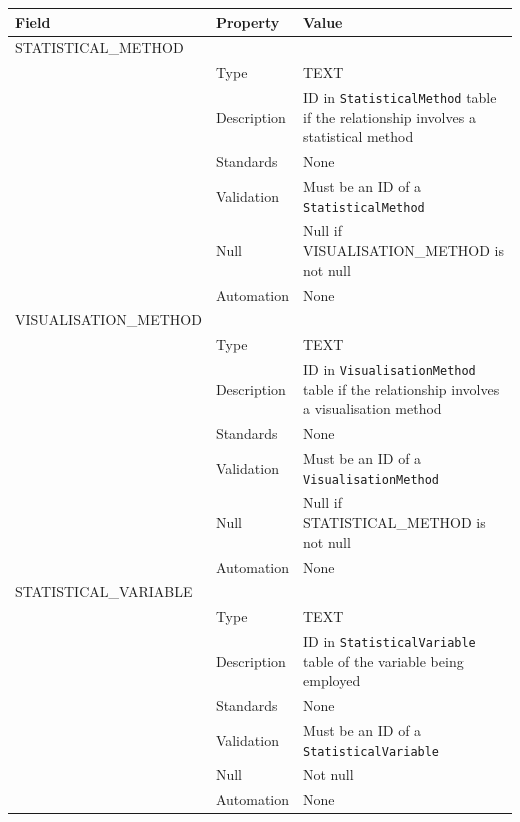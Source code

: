 \documentclass[
]{article}
\newcounter{none}
\begin{document}
{\def\LTcaptype{none} 
\begin{longtable}[]{@{}
  >{\raggedright\arraybackslash}p{}
  >{\raggedright\arraybackslash}p{}
  >{\raggedright\arraybackslash}p{}@{}}
\toprule\noalign{}
\begin{minipage}[b]{\linewidth}\raggedright
Field
\end{minipage} & \begin{minipage}[b]{\linewidth}\raggedright
Property
\end{minipage} & \begin{minipage}[b]{\linewidth}\raggedright
Value
\end{minipage} \\
\midrule\noalign{}
\endhead
\bottomrule\noalign{}
\endlastfoot
STATISTICAL\_METHOD & & \\
& Type & TEXT \\
& Description & ID in \texttt{StatisticalMethod} table if the
relationship involves a statistical method \\
& Standards & None \\
& Validation & Must be an ID of a \texttt{StatisticalMethod} \\
& Null & Null if VISUALISATION\_METHOD is not null \\
& Automation & None \\
VISUALISATION\_METHOD & & \\
& Type & TEXT \\
& Description & ID in \texttt{VisualisationMethod} table if the
relationship involves a visualisation method \\
& Standards & None \\
& Validation & Must be an ID of a \texttt{VisualisationMethod} \\
& Null & Null if STATISTICAL\_METHOD is not null \\
& Automation & None \\
STATISTICAL\_VARIABLE & & \\
& Type & TEXT \\
& Description & ID in \texttt{StatisticalVariable} table of the variable
being employed \\
& Standards & None \\
& Validation & Must be an ID of a \texttt{StatisticalVariable} \\
& Null & Not null \\
& Automation & None \\
\end{longtable}
}
\end{document}
